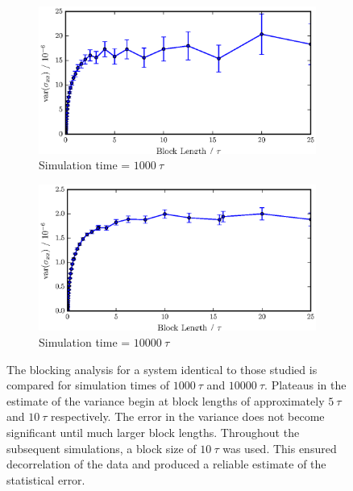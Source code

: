 \begin{figure}[h]
\hspace{-3em}
	\begin{subfigure}{.5\linewidth}
                \includegraphics[scale=0.6]{block_average_1e6.eps}
                \caption{Simulation time = $1000\ \tau$}
        \end{subfigure}
\hspace{2em}
        \begin{subfigure}{.5\linewidth}
                \includegraphics[scale=0.6]{block_average_10e6.eps}
                \caption{Simulation time = $10000\ \tau$}
	\end{subfigure}
	\caption{The blocking analysis for a system identical to those studied is compared for simulation times of $1000\ \tau$ and $10000\ \tau$.
Plateaus in the estimate of the variance begin at block lengths of approximately $5\ \tau$ and $10\ \tau$ respectively.
The error in the variance does not become significant until much larger block lengths.
Throughout the subsequent simulations, a block size of $10\ \tau$ was used.
This ensured decorrelation of the data and produced a reliable estimate of the statistical error.
}
\label{blocking}
\end{figure}

